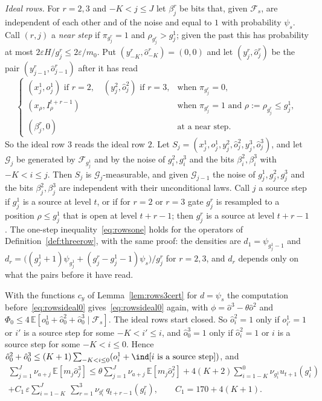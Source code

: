 \documentclass[11pt]{amsart}
\theoremstyle{definition}
\theoremstyle{remark}
\newcommand{\eps}{\varepsilon}
\newcommand{\EE}{\mathbb{E}}
\newcommand{\cF}{\mathcal{F}}
\begin{document}
\emph{Ideal rows.} For $r=2,3$ and $-K<j\le J$ let $\beta^r_j$ be bits that, given $\cF_s$, are
independent of each other and of the noise and equal to $1$ with probability $\psi_s$. Call
$(r,j)$ a \emph{near step} if $\pi_{g^r_j}=1$ and $\rho_{g^r_j}>g^1_j$; given the past this has
probability at most $2\eps H/g^r_j\le2\eps/m_0$. Put $(y^r_{-K},\hat o^r_{-K})=(0,0)$ and let
$(y^r_j,\hat o^r_j)$ be the pair $(y^r_{j-1},\hat o^r_{j-1})$ after it has read
\[
\begin{cases}
(x^1_j,o^1_j)\text{ if }r=2,\quad(y^2_j,\hat o^2_j)\text{ if }r=3,&\text{when }\pi_{g^r_j}=0,\\
(x_\rho,I^{t+r-1}_\rho)&\text{when }\pi_{g^r_j}=1\text{ and }\rho:=\rho_{g^r_j}\le g^1_j,\\
(\beta^r_j,0)&\text{at a near step.}
\end{cases}
\]
So the ideal row $3$ reads the ideal row $2$. Let
$S_j=(x^1_j,o^1_j,y^2_j,\hat o^2_j,y^3_j,\hat o^3_j)$, and let $\mathcal G_j$ be generated by
$\cF_{g^1_j}$ and by the noise of $g^2_i,g^3_i$ and the bits $\beta^2_i,\beta^3_i$ with
$-K<i\le j$. Then $S_j$ is $\mathcal G_j$-measurable, and given $\mathcal G_{j-1}$ the noise of
$g^1_j,g^2_j,g^3_j$ and the bits $\beta^2_j,\beta^3_j$ are independent with their unconditional
laws. Call $j$ a source step if $g^1_j$ is a source at level $t$, or if for $r=2$ or $r=3$ gate
$g^r_j$ is resampled to a position $\rho\le g^1_j$ that is open at level $t+r-1$; then $g^r_j$ is
a source at level $t+r-1$. The one-step inequality~\eqref{eq:rowsone} holds for the operators of
Definition~\ref{def:threerow}, with the same proof: the densities are
$d_1=\psi_{g^1_j-1}$ and $d_r=\bigl((g^1_j+1)\psi_{g^1_j}+(g^r_j-g^1_j-1)\psi_s\bigr)/g^r_j$ for
$r=2,3$, and $d_r$ depends only on what the pairs before it have read.

With the functions $c_y$ of Lemma~\ref{lem:rows3cert} for $d=\psi_s$ the computation
before~\eqref{eq:rowsideal0} gives~\eqref{eq:rowsideal0} again, with $\phi=\hat o^3-\theta\hat o^2$
and $\Phi_0\le4\,\EE[o^1_0+\hat o^2_0+\hat o^3_0\mid\cF_s]$. The ideal rows start closed. So
$\hat o^2_i=1$ only if $o^1_{i'}=1$ or $i'$ is a source step for some $-K<i'\le i$, and
$\hat o^3_0=1$ only if $\hat o^2_i=1$ or $i$ is a source step for some $-K<i\le0$. Hence
$\hat o^2_0+\hat o^3_0\le(K+1)\sum_{-K<i\le0}(o^1_i+\ind[i\text{ is a source step}])$, and
\begin{multline}\label{eq:rows3ideal}
\sum_{j=1}^{J}\nu_{a+j}\,\EE[m_j\hat o^3_j]\le\theta\sum_{j=1}^{J}\nu_{a+j}\,\EE[m_j\hat o^2_j]
+4(K+2)\sum_{i=1-K}^{0}\nu_{g^1_i}u_{t+1}(g^1_i)\\
+C_1\,\eps\sum_{i=1-K}^{J}\ \sum_{r=1}^{3}\nu_{g^r_i}\,q_{t+r-1}(g^r_i),\qquad C_1=170+4(K+1).
\end{multline}
\end{document}

